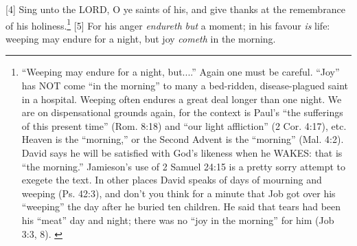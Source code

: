 [4] \textcolor[rgb]{0.00,0.00,1.00}{Sing unto the LORD, O ye saints of his, and give thanks at the remembrance of his holiness.}\footnote{“Weeping may endure for a night, but....” Again one must be careful. “Joy” has NOT come “in the morning” to many a bed-ridden, disease-plagued saint in a hospital. Weeping often endures a great deal longer than one night. We are on dispensational grounds again, for the context is Paul’s “the sufferings of this present time” (Rom. 8:18) and “our light affliction” (2 Cor. 4:17), etc. Heaven is the “morning,” or the Second Advent is the “morning” (Mal. 4:2). David says he will be satisfied with God’s likeness when he WAKES: that is “the morning.” Jamieson’s use of 2 Samuel 24:15 is a pretty sorry attempt to exegete the text. In other places David speaks of days of mourning and weeping (Ps. 42:3), and don’t you think for a minute that Job got over his “weeping” the day after he buried ten children. He said that tears had been his “meat” day and night; there was no “joy in the morning” for him (Job 3:3, 8). \cite{Ruckman1992Psalms}}
[5] \textcolor[rgb]{0.00,0.00,1.00}{For his anger \emph{endureth} \emph{but} a moment; in his favour \emph{is} life: weeping may endure for a night, but joy \emph{cometh} in the morning.}
